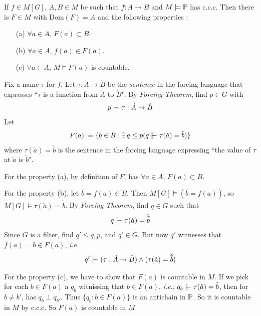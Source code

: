 \documentclass[12pt,a4paper]{article}
\newenvironment{proof}
{\begin{changemargin}{0.5cm}{0.5cm} 
	}%
	{\end{changemargin}
}
\newenvironment{p}
{\begin{proof} 
	}%
	{\end{proof}
}
\begin{document}
\lem If $f\in M[G]$, $A, B\in M$ be such that $f: A\rightarrow B$ and $M\models \mathbb{P}$ has c.c.c. Then there is $F\in M$ with $\text{Dom}(F) = A$ and the following properties :
\begin{itemize}
\item[(a)] $\forall a\in A$, $F(a) \subset B$.
\item[(b)] $\forall a\in A$, $f(a) \in F(a)$. 
\item[(c)] $\forall a\in A$, $M\models F(a)$ is countable.
\end{itemize}
\begin{p}
\pf Fix a name $\tau$ for $f$. Let $\tau : \check{A} \rightarrow \check{B}$ be the \emph{sentence} in the forcing language that expresses ``$\tau$ is a function from $\check{A}$ to $\check{B}$". By \emph{Forcing Theorem}, find $p\in G$ with
\begin{align*}
p\forces \tau : \check{A} \rightarrow \check{B}
\end{align*}
Let
\begin{align*}
F(a) := \{b\in B : \exists \, q\leq p (q\forces \tau(\check{a}) = \check{b} ) \}
\end{align*}  
where $\tau(\check{a}) = \check{b}$ is the sentence in the forcing language expressing ``the value of $\tau$ at $\check{a}$ is $\check{b}$".

\quad For the property (a), by definition of $F$, has $\forall a\in A$, $F(a) \subset B$.

\quad For the property (b), let $\bar{b} = f(a) \in B$. Then $M[G] \models (\bar{b} = f(a))$, so $M[G]\models \tau(\check{a}) = \check{\bar{b}}$. By \emph{Forcing Theorem}, find $q\in G$ such that
\begin{align*}
q\forces \tau(\check{a}) = \check{\bar{b}}
\end{align*} 
Since $G$ is a filter, find $q' \leq q, p$, and $q'\in G$. But now $q'$ witnesses that $f(a) = \bar{b} \in F(a)$, \textit{i.e.}
\begin{align*}
q' \forces (\tau : \check{A} \rightarrow \check{B}) \wedge (\tau(\check{a}) = \check{\bar{b}})
\end{align*}

\quad For the property (c), we have to show that $F(a)$ is countable in $M$. If we pick for each $b\in F(a)$ a $q_b$ witnissing that $b\in F(a)$, \textit{i.e.}, $q_b \forces \tau(\check{a}) = \check{b}$, then for $b\neq b'$, has $q_b \perp q_{b'}$. Thus $\{q_b : b\in F(a)\}$ is an antichain in $\mathbb{P}$. So it is countable in $M$ by c.c.c. So $F(a)$ is countable in $M$.

\eop
\end{p}
\s
\end{document}
